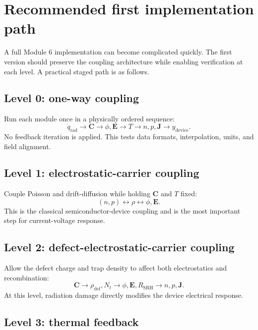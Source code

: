 \documentclass[11pt]{article}
\newcommand{\Evec}{\bm{E}}
\newcommand{\Jvec}{\bm{J}}
\newcommand{\Cvec}{\bm{C}}
\begin{document}
\section{Recommended first implementation path}

A full Module 6 implementation can become complicated quickly. The first version should preserve the coupling architecture while enabling verification at each level. A practical staged path is as follows.

\subsection{Level 0: one-way coupling}

Run each module once in a physically ordered sequence:
\begin{equation}
\dot{q}_{\mathrm{rad}}
\rightarrow
\Cvec
\rightarrow
\phi,\Evec
\rightarrow
T
\rightarrow
n,p,\Jvec
\rightarrow
 y_{\mathrm{device}}.
\end{equation}
No feedback iteration is applied. This tests data formats, interpolation, units, and field alignment.

\subsection{Level 1: electrostatic-carrier coupling}

Couple Poisson and drift-diffusion while holding \(\Cvec\) and \(T\) fixed:
\begin{equation}
(n,p) \leftrightarrow \rho \leftrightarrow \phi,\Evec.
\end{equation}
This is the classical semiconductor-device coupling and is the most important step for current-voltage response.

\subsection{Level 2: defect-electrostatic-carrier coupling}

Allow the defect charge and trap density to affect both electrostatics and recombination:
\begin{equation}
\Cvec \rightarrow \rho_{\mathrm{def}},N_t \rightarrow \phi,\Evec,R_{\mathrm{SRH}} \rightarrow n,p,\Jvec.
\end{equation}
At this level, radiation damage directly modifies the device electrical response.

\subsection{Level 3: thermal feedback}
\end{document}
